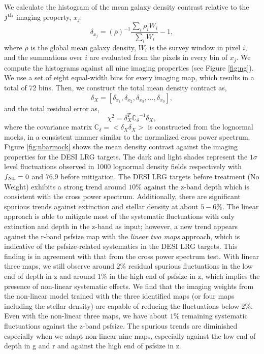 We calculate the histogram of the mean galaxy density contrast relative to the $j^{\rm th}$ imaging property, $x_{j}$:
\begin{equation}
\delta_{x_{j}} = ({\overline{\rho}})^{-1} \frac{\sum_{i} \rho_{i} W_{i}}{\sum_{i} W_{i}} - 1,
\end{equation}
where $\overline{\rho}$ is the global mean galaxy density, $W_{i}$ is the survey window in pixel $i$, and the summations over $i$ are evaluated from the pixels in every bin of $x_{j}$. We compute the histograms against all nine imaging properties (see Figure \ref{fig:ng}). We use a set of eight equal-width bins for every imaging map, which results in a total of 72 bins. Then, we construct the total mean density contract as,
\begin{equation}
\delta_{X} = [\delta_{x_{1}}, \delta_{x_{2}}, \delta_{x_{3}}, ..., \delta_{x_{9}}],
\end{equation}
and the total residual error as,
\begin{equation}
\chi^{2} = \delta_{X}^{T} \mathbb{C_{\delta}}^{-1} \delta_{X},
\end{equation}
where the covariance matrix $\mathbb{C}_{\delta} = < \delta_{X} \delta_{X}>$ is constructed from the lognormal mocks, in a consistent manner similar to the normalized cross power spectrum. Figure \ref{fig:nbarmock} shows the mean density contrast against the imaging properties for the DESI LRG targets. The dark and light shades represent the $1\sigma$ level fluctuations observed in 1000 lognormal density fields respectively with $f_{\rm NL}=0$ and $76.9$ before mitigation. The DESI LRG targets before treatment (No Weight) exhibits a strong trend around $10\%$ against the z-band depth which is consistent with the cross power spectrum. Additionally, there are significant spurious trends against extinction and stellar density at about $5-6\%$. The linear approach is able to mitigate most of the systematic fluctuations with only extinction and depth in the z-band as input; however, a new trend appears against the r-band psfsize map with the \textit{linear two maps} approach, which is indicative of the psfsize-related systematics in the DESI LRG targets. This finding is in agreement with that from the cross power spectrum test. With linear three maps, we still observe around $2\%$ residual spurious fluctuations in the low end of depth in z and around $1\%$ in the high end of psfsize in z, which implies the presence of non-linear systematic effects. We find that the imaging weights from the non-linear model trained with the three identified maps (or four maps including the stellar density) are capable of reducing the fluctuations below $2\%$. Even with the non-linear three maps, we have about $1\%$ remaining systematic fluctuations against the z-band psfsize. The spurious trends are diminished especially when we adapt non-linear nine maps, especially against the low end of depth in g and r and against the high end of psfsize in z. 

